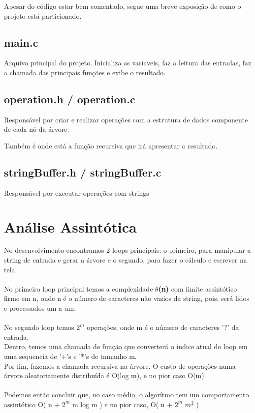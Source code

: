 \documentclass{article}
\begin{document}
Apesar do código estar bem comentado, segue uma breve exposição de como o projeto está particionado.

\subsection{main.c}
Arquivo principal do projeto. Inicializa as varíaveis, faz a leitura das entradas, faz a chamada das principais funções e exibe o resultado.

\subsection{operation.h / operation.c}
Responsável por criar e realizar operações com a estrutura de dados componente de cada nó da árvore.

Também é onde está a função recursiva que irá apresentar o resultado.

\subsection{stringBuffer.h / stringBuffer.c}
Responsável por executar operações com strings

\section{Análise Assintótica}
No desenvolvimento encontramos 2 loops principais: o primeiro, para manipular a string de entrada e gerar a árvore e o segundo, para fazer o cálculo e escrever na tela.
\\
\\
No primeiro loop principal temos a complexidade \textbf{$\theta$(n)} com limite assintótico firme em n, onde n é o número de caracteres não vazios da string, pois, será lidos e processados um a um.
\\
\\
No segundo loop temos $2^m$ operações, onde m é o número de caracteres '?' da entrada.
\\
Dentro, temos uma chamada de função que converterá o índice atual do loop em uma sequencia de '+'s e '*'s de tamanho m.
\\
Por fim, fazemos a chamada recursiva na árvore. O custo de operações numa árvore aleatoriamente distribuída é O(log m), e no pior caso O(m)
\\
\\
Podemos então concluir que, no caso médio, o algorítmo tem um comportamento assintótico O( n + $2^m$ m log m ) e no pior caso, O( n + $2^m$ $m^2$ )
\end{document}
